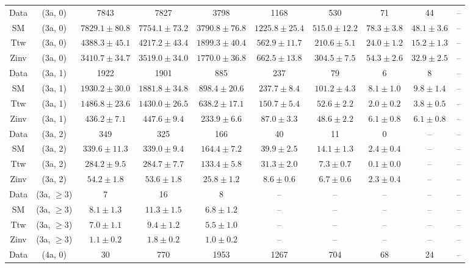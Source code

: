 \begin{table}[h!]
{\begin{tabular}{cccccccccc}
	Data & (3a, 0) & 7843 & 7827 & 3798 & 1168 & 530 & 71 & 44 & -- \\[0.5ex] 
	SM & (3a, 0) & $7829.1\pm 80.8$ & $7754.1\pm 73.2$ & $3790.8\pm 76.8$ & $1225.8\pm 25.4$ & $515.0\pm 12.2$ & $78.3\pm 3.8$ & $48.1\pm 3.6$ & -- \\[0.5ex] 
	Ttw & (3a, 0) & $4388.3\pm 45.1$ & $4217.2\pm 43.4$ & $1899.3\pm 40.4$ & $562.9\pm 11.7$ & $210.6\pm 5.1$ & $24.0\pm 1.2$ & $15.2\pm 1.3$ & -- \\[0.5ex] 
	Zinv & (3a, 0) & $3410.7\pm 34.7$ & $3519.0\pm 34.0$ & $1770.0\pm 36.8$ & $662.5\pm 13.8$ & $304.5\pm 7.5$ & $54.3\pm 2.6$ & $32.9\pm 2.5$ & -- \\[0.5ex] 
	Data & (3a, 1) & 1922 & 1901 & 885 & 237 & 79 & 6 & 8 & -- \\[0.5ex] 
	SM & (3a, 1) & $1930.2\pm 30.0$ & $1881.8\pm 34.8$ & $898.4\pm 20.6$ & $237.7\pm 8.4$ & $101.2\pm 4.3$ & $8.1\pm 1.0$ & $9.8\pm 1.4$ & -- \\[0.5ex] 
	Ttw & (3a, 1) & $1486.8\pm 23.6$ & $1430.0\pm 26.5$ & $638.2\pm 17.1$ & $150.7\pm 5.4$ & $52.6\pm 2.2$ & $2.0\pm 0.2$ & $3.8\pm 0.5$ & -- \\[0.5ex] 
	Zinv & (3a, 1) & $436.2\pm 7.1$ & $447.6\pm 9.4$ & $233.9\pm 6.6$ & $87.0\pm 3.3$ & $48.6\pm 2.2$ & $6.1\pm 0.8$ & $6.1\pm 0.8$ & -- \\[0.5ex] 
	Data & (3a, 2) & 349 & 325 & 166 & 40 & 11 & 0 & -- & -- \\[0.5ex] 
	SM & (3a, 2) & $339.6\pm 11.3$ & $339.0\pm 9.4$ & $164.4\pm 7.2$ & $39.9\pm 2.5$ & $14.1\pm 1.3$ & $2.4\pm 0.4$ & -- & -- \\[0.5ex] 
	Ttw & (3a, 2) & $284.2\pm 9.5$ & $284.7\pm 7.7$ & $133.4\pm 5.8$ & $31.3\pm 2.0$ & $7.3\pm 0.7$ & $0.1\pm 0.0$ & -- & -- \\[0.5ex] 
	Zinv & (3a, 2) & $54.2\pm 1.8$ & $53.6\pm 1.8$ & $25.8\pm 1.2$ & $8.6\pm 0.6$ & $6.7\pm 0.6$ & $2.3\pm 0.4$ & -- & -- \\[0.5ex] 
	Data & (3a, $\ge3$) & 7 & 16 & 8 & -- & -- & -- & -- & -- \\[0.5ex] 
	SM & (3a, $\ge3$) & $8.1\pm 1.3$ & $11.3\pm 1.5$ & $6.8\pm 1.2$ & -- & -- & -- & -- & -- \\[0.5ex] 
	Ttw & (3a, $\ge3$) & $7.0\pm 1.1$ & $9.4\pm 1.2$ & $5.5\pm 1.0$ & -- & -- & -- & -- & -- \\[0.5ex] 
	Zinv & (3a, $\ge3$) & $1.1\pm 0.2$ & $1.8\pm 0.2$ & $1.0\pm 0.2$ & -- & -- & -- & -- & -- \\[0.5ex] 
	Data & (4a, 0) & 30 & 770 & 1953 & 1267 & 704 & 68 & 24 & -- \\[0.5ex] 

\end{tabular}}
\end{table}
